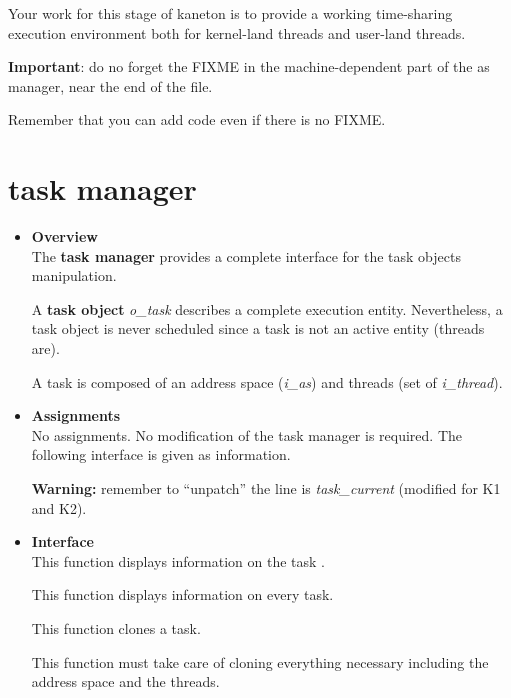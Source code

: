 Your work for this stage of kaneton is to provide a working
time-sharing execution environment both for kernel-land threads and
user-land threads.

\textbf{Important}: do no forget the FIXME in the machine-dependent
part of the as manager, near the end of the file.

Remember that you can add code even if there is no FIXME.


%
%

\newpage

\section{\textbf{task} manager}

\begin{itemize}
  \item {\bf Overview}\\

    The \textbf{task manager} provides a complete interface for the
    task objects manipulation.

    A \textbf{task object} \textit{o\_task} describes a complete
    execution entity. Nevertheless, a task object is never scheduled
    since a task is not an active entity (threads are).

    A task is composed of an address space (\textit{i\_as}) and threads
    (set of \textit{i\_thread}).

  \item {\bf Assignments}\\

    No assignments. No modification of the task manager is
    required. The following interface is given as information.

    \textbf{Warning:} remember to ``unpatch'' the line is
    \emph{task\_current} (modified for K1 and K2).

  \item {\bf Interface}\\

	 {
	   This function displays information on the task .
	 }

	 {
	   This function displays information on every task.
	 }

	 {
	   This function clones a task.

	   This function must take care of cloning everything necessary
	   including the address space and the threads.
	 }


\end{itemize}

